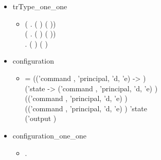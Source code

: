 \begin{itemize}
\begin{itemize}
 \end{itemize}
 \item trType_one_one
  \begin{itemize}
    \item[] \HOLTokenTurnstile{} (\HOLSymConst{\HOLTokenForall{}} . (  \HOLSymConst{=}  ) \HOLSymConst{\HOLTokenEquiv{}} ( \HOLSymConst{=} )) \HOLSymConst{\HOLTokenConj{}}\\
   (\HOLSymConst{\HOLTokenForall{}} . (  \HOLSymConst{=}  ) \HOLSymConst{\HOLTokenEquiv{}} ( \HOLSymConst{=} )) \HOLSymConst{\HOLTokenConj{}}\\
   \HOLSymConst{\HOLTokenForall{}} . (  \HOLSymConst{=}  ) \HOLSymConst{\HOLTokenEquiv{}} ( \HOLSymConst{=} )
 \end{itemize}
 \item configuration
  \begin{itemize}
    \item[]  =
     (('command , 'principal, 'd, 'e)  -> )\\
        ('state -> ('command , 'principal, 'd, 'e) )\\
        (('command , 'principal, 'd, 'e)  )\\
        (('command , 'principal, 'd, 'e)  ) 'state\\
        ('output )
      \end{itemize}
      \item configuration_one_one
  \begin{itemize}
    \item[] \HOLTokenTurnstile{} \HOLSymConst{\HOLTokenForall{}}           .\\

\end{itemize}
\end{itemize}

